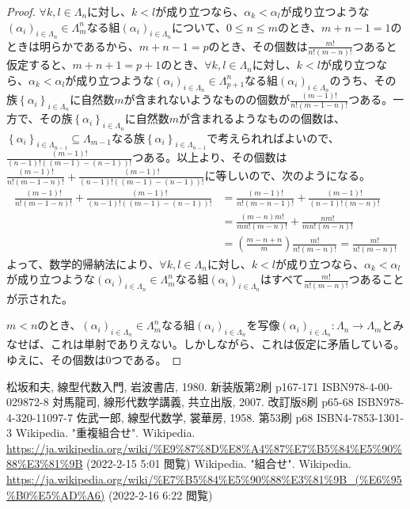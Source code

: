 \documentclass[dvipdfmx]{jsarticle}
\begin{document}
\begin{proof}
$\forall k,l \in \varLambda_{n}$に対し、$k < l$が成り立つなら、$\alpha_{k} < \alpha_{l}$が成り立つような$\left( \alpha_{i} \right)_{i \in \varLambda_{n}} \in \varLambda_{m}^{n}$なる組$\left( \alpha_{i} \right)_{i \in \varLambda_{n}}$について、$0 \leq n \leq m$のとき、$m + n - 1 = 1$のときは明らかであるから、$m + n - 1 = p$のとき、その個数は$\frac{m!}{n!(m - n)!}$つあると仮定すると、$m + n + 1 = p + 1$のとき、$\forall k,l \in \varLambda_{n}$に対し、$k < l$が成り立つなら、$\alpha_{k} < \alpha_{l}$が成り立つような$\left( \alpha_{i} \right)_{i \in \varLambda_{n}} \in \varLambda_{p + 1}^{n}$なる組$\left( \alpha_{i} \right)_{i \in \varLambda_{n}}$のうち、その族$\left\{ \alpha_{i} \right\}_{i \in \varLambda_{n}}$に自然数$m$が含まれないようなものの個数が$\frac{(m - 1)!}{n!(m - 1 - n)!}$つある。一方で、その族$\left\{ \alpha_{i} \right\}_{i \in \varLambda_{n}}$に自然数$m$が含まれるようなものの個数は、$\left\{ \alpha_{i} \right\}_{i \in \varLambda_{n - 1}} \subseteq \varLambda_{m - 1}$なる族$\left\{ \alpha_{i} \right\}_{i \in \varLambda_{n - 1}}$で考えられればよいので、$\frac{(m - 1)!}{(n - 1)!\left( (m - 1) - (n - 1) \right)!}$つある。以上より、その個数は$\frac{(m - 1)!}{n!(m - 1 - n)!} + \frac{(m - 1)!}{(n - 1)!\left( (m - 1) - (n - 1) \right)!}$に等しいので、次のようになる。
\begin{align*}
\frac{(m - 1)!}{n!(m - 1 - n)!} + \frac{(m - 1)!}{(n - 1)!\left( (m - 1) - (n - 1) \right)!} &= \frac{(m - 1)!}{n!(m - n - 1)!} + \frac{(m - 1)!}{(n - 1)!(m - n)!}\\
&= \frac{(m - n)m!}{mn!(m - n)!} + \frac{nm!}{mn!(m - n)!}\\
&= \left( \frac{m - n + n}{m} \right)\frac{m!}{n!(m - n)!} = \frac{m!}{n!(m - n)!}
\end{align*}
よって、数学的帰納法により、$\forall k,l \in \varLambda_{n}$に対し、$k < l$が成り立つなら、$\alpha_{k} < \alpha_{l}$が成り立つような$\left( \alpha_{i} \right)_{i \in \varLambda_{n}} \in \varLambda_{m}^{n}$なる組$\left( \alpha_{i} \right)_{i \in \varLambda_{n}}$はすべて$\frac{m!}{n!(m - n)!}$つあることが示された。\par
$m < n$のとき、$\left( \alpha_{i} \right)_{i \in \varLambda_{n}} \in \varLambda_{m}^{n}$なる組$\left( \alpha_{i} \right)_{i \in \varLambda_{n}}$を写像$\left( \alpha_{i} \right)_{i \in \varLambda_{n}}:\varLambda_{n} \rightarrow \varLambda_{m}$とみなせば、これは単射でありえない。しかしながら、これは仮定に矛盾している。ゆえに、その個数は$0$つである。
\end{proof}
\begin{thebibliography}{50}
  松坂和夫, 線型代数入門, 岩波書店, 1980. 新装版第2刷 p167-171 ISBN978-4-00-029872-8
  対馬龍司, 線形代数学講義, 共立出版, 2007. 改訂版8刷 p65-68 ISBN978-4-320-11097-7
  佐武一郎, 線型代数学, 裳華房, 1958. 第53刷 p68 ISBN4-7853-1301-3
  Wikipedia. "重複組合せ". Wikipedia. \url{https://ja.wikipedia.org/wiki/%E9%87%8D%E8%A4%87%E7%B5%84%E5%90%88%E3%81%9B} (2022-2-15 5:01 閲覧)
  Wikipedia. "組合せ". Wikipedia. \url{https://ja.wikipedia.org/wiki/%E7%B5%84%E5%90%88%E3%81%9B_(%E6%95%B0%E5%AD%A6)} (2022-2-16 6:22 閲覧)
\end{thebibliography}
\end{document}
